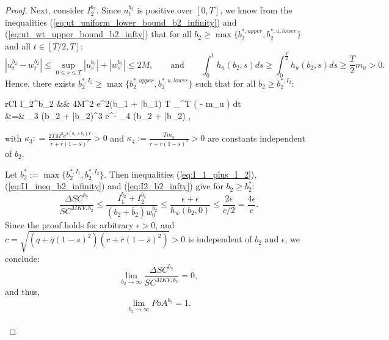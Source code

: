 \documentclass[11pt]{article}
\begin{document}
\begin{proof}
	Next, consider $I_2^{b_2}$. Since $u_t^{b_2}$ is positive over $[0,T]$, we know from the inequalities (\ref{eq:ut_uniform_lower_bound_b2_infinity}) and (\ref{eq:ut_wt_upper_bound_b2_infty}) that for all $b_2 \geq \max\{ b_2^{*,upper}, b_2^{*,u,lower} \}$ and all $t \in [T/2,T]$:
	\begin{equation*}
		\left\vert u_t^{b_2} - w_t^{b_2} \right\vert \leq \sup_{0 \leq s \leq T} \left\vert u_s^{b_2} \right\vert + \left\vert w_s^{b_2} \right\vert  \leq 2M,
		\qquad \text{and} \qquad
		\int_0^{t} h_u(b_2,s) ds \geq \int_0^{\frac{T}{2}} h_u(b_2,s) ds \geq \frac{T}{2} m_u >0.
	\end{equation*}
	Hence, there exists $b_2^{*,I_2} \geq \max \{ b_2^{*,upper}, b_2^{*,u,lower} \}$ such that for all $b_2 \geq b_2^{*,I_2}$:
	\begin{IEEEeqnarray}{rCl}
		I_2^{b_2} &\leq&   \cdot 4M^2 e^{2(b_1 + \bar{b}_1) T} \int_{}^{T} \exp\left( -  \cdot m_u \right) dt \nonumber\\	
		&=& \kappa_3 (b_2 + \bar{b}_2)^3 e^{- \kappa_4 (b_2 + \bar{b}_2)} \leq \epsilon,
	\label{eq:I2_b2_infty}
	\end{IEEEeqnarray}
	with $\kappa_3: = \frac{2 TM^2 e^{2(b_1 + \bar{b}_1) T} }{r + \bar{r}(1-\bar{s})^2} >0$ and $\kappa_4 :=  \frac{T  m_u}{r + \bar{r}(1-\bar{s})^2}>0$ are constants independent of $b_2$. 	
	
	Let $b_2^* := \max \{ b_2^{*,I_1}, b_2^{*,I_2}\}$. Then inequalities (\ref{eq:I_1_plus_I_2}), (\ref{eq:I1_ineq_b2_infinity}) and (\ref{eq:I2_b2_infty}) give for $b_2 \geq b_2^*$:
	\begin{equation*}
		\frac{\Delta SC^{b_2}}{SC^{MKV,b_2}} \leq \frac{I_1^{b_2} + I_2^{b_2}}{(b_2 + \bar{b}_2) w_0^{b_2}} \leq \frac{ \epsilon + \epsilon }{h_w(b_2,0)} \leq \frac{2\epsilon}{c/2}=\frac{4\epsilon}{c}.
	\end{equation*}
	Since the proof holds for arbitrary $\epsilon>0$, and $c=\sqrt{(q+\bar{q}(1-s)^2)(r+\bar{r}(1-\bar{s})^2)}>0$ is independent of $b_2$ and $\epsilon$, we conclude:
	\begin{equation*}
		\lim_{b_2 \to \infty} \frac{\Delta SC^{b_2}}{SC^{MKV,b_2}} = 0, 
	\end{equation*}
	and thus,
	$$ \lim_{b_2 \to \infty} PoA^{b_2} = 1.$$\\
	

\end{proof}
\end{document}
